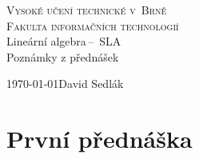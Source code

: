 \documentclass[a4paper, 11pt]{article}
\begin{document}
\begin{titlepage}

	\begin{center}
		\textsc{\Huge Vysoké učení technické v~Brně}\\
				  \huge{\textsc{Fakulta informačních technologií}}\\
		{\LARGE 	Lineární algebra\,--\, SLA}\\
				{\Huge Poznámky z přednášek}
	\end{center}
	{\Large\today \hfill David Sedlák}

\end{titlepage}

\section{První přednáška}


\newpage

\def\refname{Použitá literatura}

\end{document}
